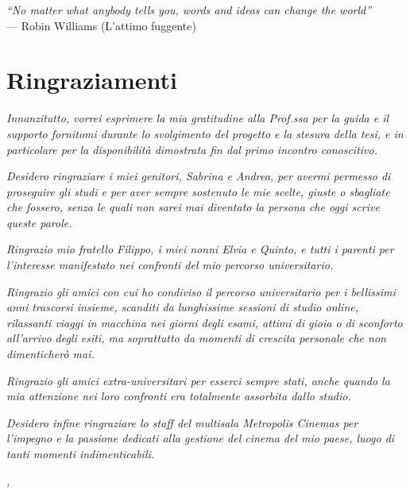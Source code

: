 \cleardoublepage
{}
{}

\begin{flushright}{
    \slshape
    ``No matter what anybody tells you, words and ideas can change the world''} \\
    \medskip
    --- Robin Williams (L'attimo fuggente)
\end{flushright}


\bigskip

\begingroup
\let\clearpage\relax
\let\cleardoublepage\relax
\let\cleardoublepage\relax

\chapter*{Ringraziamenti}

\par \textit{Innanzitutto, vorrei esprimere la mia gratitudine alla Prof.ssa \myProf{} per la guida e il supporto fornitomi durante lo svolgimento del progetto e la stesura della tesi, e in particolare per la disponibilità dimostrata fin dal primo incontro conoscitivo.}

\vspace{10pt}
\par\noindent \textit{Desidero ringraziare i miei genitori, Sabrina e Andrea, per avermi permesso di proseguire gli studi e per aver sempre sostenuto le mie scelte, giuste o sbagliate che fossero, senza le quali non sarei mai diventato la persona che oggi scrive queste parole.}

\vspace{10pt}
\par\noindent \textit{Ringrazio mio fratello Filippo, i miei nonni Elvia e Quinto, e tutti i parenti per l’interesse manifestato nei confronti del mio percorso universitario.}

\vspace{10pt}
\par\noindent \textit{Ringrazio gli amici con cui ho condiviso il percorso universitario per i bellissimi anni trascorsi insieme, scanditi da lunghissime sessioni di studio online, rilassanti viaggi in macchina nei giorni degli esami, attimi di gioia o di sconforto all’arrivo degli esiti, ma soprattutto da momenti di crescita personale che non dimenticherò mai.}

\vspace{10pt}
\par\noindent \textit{Ringrazio gli amici extra-universitari per esserci sempre stati, anche quando la mia attenzione nei loro confronti era totalmente assorbita dallo studio.}

\vspace{10pt}
\par\noindent \textit{Desidero infine ringraziare lo staff del multisala Metropolis Cinemas per l’impegno e la passione dedicati alla gestione del cinema del mio paese, luogo di tanti momenti indimenticabili.}
\bigskip

\noindent\textit{\myLocation, \myTime}
\hfill \myName

\endgroup
